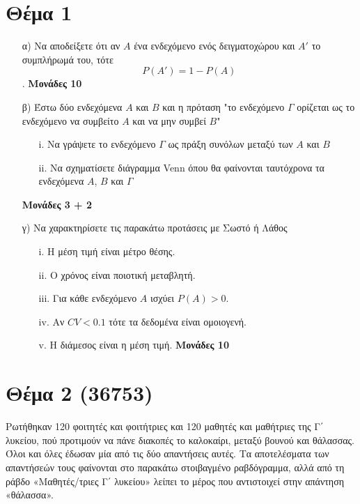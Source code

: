 \documentclass[12pt]{extarticle}
\begin{document}
\section*{Θέμα 1}
\noindent
\begin{enumerate}
    \item[α)] Να αποδείξετε ότι αν $Α$ ένα ενδεχόμενο ενός δειγματοχώρου και $Α'$ το συμπλήρωμά του, τότε $$P(Α')=1-P(Α)$$. \hspace*{\fill} \textbf{Μονάδες 10}
    \item[β)] Έστω δύο ενδεχόμενα $Α$ και $Β$ και η πρόταση
        "το ενδεχόμενο $Γ$ ορίζεται ως το ενδεχόμενο να συμβείτο $Α$ και να μην συμβεί $Β$"

        \begin{enumerate}
            \item[i.] Να γράψετε το ενδεχόμενο $Γ$ ως πράξη συνόλων μεταξύ των $Α$ και $Β$
            \item[ii.] Να σχηματίσετε διάγραμμα Venn όπου θα φαίνονται ταυτόχρονα τα ενδεχόμενα $Α$, $Β$ και $Γ$
        \end{enumerate}\hspace*{\fill} \textbf{Μονάδες 3 + 2}

    \item[γ)] Να χαρακτηρίσετε τις παρακάτω προτάσεις με Σωστό ή Λάθος
        \begin{enumerate}
            \item [i.] Η μέση τιμή είναι μέτρο θέσης.
            \item [ii.] Ο χρόνος είναι ποιοτική μεταβλητή.
            \item [iii.] Για κάθε ενδεχόμενο $Α$ ισχύει $P(Α)>0$.
            \item [iv.] Αν $CV < 0.1$ τότε τα δεδομένα είναι ομοιογενή.
            \item [v.] Η διάμεσος είναι η μέση τιμή.\hspace*{\fill} \textbf{Μονάδες 10}
        \end{enumerate}

\end{enumerate}

\section*{Θέμα 2 (36753)}
\noindent

Ρωτήθηκαν 120 φοιτητές και φοιτήτριες και 120 μαθητές και μαθήτριες της Γ΄ λυκείου, πού προτιμούν να πάνε διακοπές το καλοκαίρι, μεταξύ βουνού και θάλασσας. Όλοι και όλες έδωσαν μία από τις δύο απαντήσεις αυτές. Τα αποτελέσματα των απαντήσεών τους φαίνονται στο παρακάτω στοιβαγμένο ραβδόγραμμα, αλλά από τη ράβδο «Μαθητές/τριες Γ΄ λυκείου» λείπει το μέρος που αντιστοιχεί στην απάντηση «θάλασσα».
\end{document}
